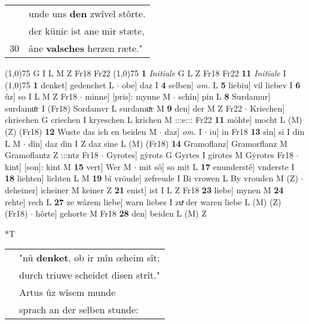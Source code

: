 \documentclass[8pt,a4paper,notitlepage]{article}
\begin{document}
\begin{table}[ht]
\begin{minipage}[t]{0.5\linewidth}
\begin{tabular}{rl}
 & unde uns \textbf{den} zwîvel stôrte.\\ 
 & der künic ist ane mir stæte,\\ 
30 & âne \textbf{valsches} herzen ræte."\\ 
\end{tabular}
\scriptsize
\line(1,0){75} \newline
G I L M Z Fr18 Fr22 \newline
\line(1,0){75} \newline
\textbf{1} \textit{Initiale} G L Z Fr18 Fr22  \textbf{11} \textit{Initiale} I  \newline
\line(1,0){75} \newline
\textbf{1} denket] gedenchet L  $\cdot$ obe] daz I \textbf{4} selben] \textit{om.} L \textbf{5} liebiu] vil liebev I \textbf{6} ûz] so I L M Z Fr18  $\cdot$ minne] [pris]: mynne M  $\cdot$ schîn] pin L \textbf{8} Surdamur] surdamuͦr I (Fr18) Sordamvr L surdamuͯr M \textbf{9} den] der M Z Fr22  $\cdot$ Kriechen] chriechen G criechen I kryeschen L krichen M :::e::: Fr22 \textbf{11} möhte] mocht L (M) (Z) (Fr18) \textbf{12} Wuste das ich en beiden M  $\cdot$ daz] \textit{om.} I  $\cdot$ iu] in Fr18 \textbf{13} sîn] si I din L M  $\cdot$ dîn] daz din I Z daz sine L (M) (Fr18) \textbf{14} Gramoflanz] Gramorflanz M Gramoflantz Z :::ntz Fr18  $\cdot$ Gyrotes] gẏrots G Gyrtes I girotes M Gẏrotes Fr18  $\cdot$ kint] [son]: kint M \textbf{15} vert] Wer M  $\cdot$ mit sô] so mit L \textbf{17} enunderstê] vnderste I \textbf{18} liehten] lichten L M \textbf{19} bî vröude] zefreude I Bi vrowen L By vrouden M (Z)  $\cdot$ deheiner] icheiner M keiner Z \textbf{21} enist] ist I L Z Fr18 \textbf{23} liebe] mynen M \textbf{24} rehte] rech L \textbf{27} ze wârem liebe] warn liebes I zuͯ der waren liebe L (M) (Z) (Fr18)  $\cdot$ hôrte] gehorte M Fr18 \textbf{28} den] beiden L (M) Z \newline
\end{minipage}
\hspace{0.5cm}
\begin{minipage}[t]{0.5\linewidth}
\small
\begin{center}*T
\end{center}
\begin{tabular}{rl}
 & "nû \textbf{denket}, ob ir mîn œheim sît;\\ 
 & durch triuwe scheidet disen strît."\\ 
 & Artus ûz wîsem munde\\ 
 & sprach an der selben stunde:\\ 

\end{tabular}
\end{minipage}
\end{table}
\end{document}
